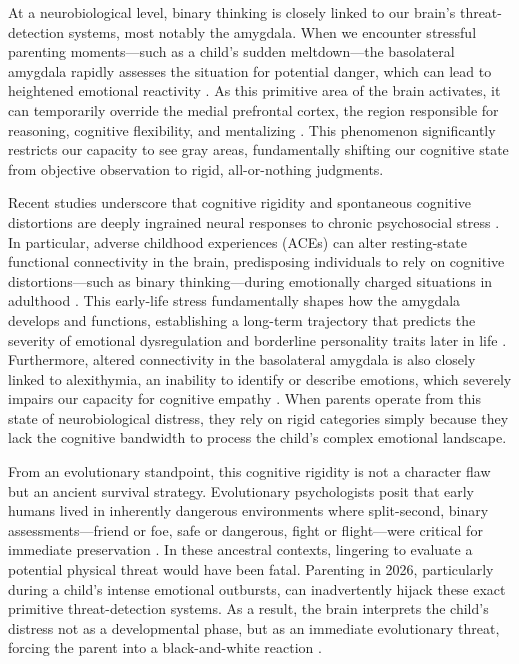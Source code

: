 At a neurobiological level, binary thinking is closely linked to our brain's threat-detection systems, most notably the amygdala.
When we encounter stressful parenting moments---such as a child's sudden meltdown---the basolateral amygdala rapidly assesses the situation for potential danger, which can lead to heightened emotional reactivity \citep{iidaka2024}.
As this primitive area of the brain activates, it can temporarily override the medial prefrontal cortex, the region responsible for reasoning, cognitive flexibility, and mentalizing \citep{he2025, mavrych2025}.
This phenomenon significantly restricts our capacity to see gray areas, fundamentally shifting our cognitive state from objective observation to rigid, all-or-nothing judgments.

Recent studies underscore that cognitive rigidity and spontaneous cognitive distortions are deeply ingrained neural responses to chronic psychosocial stress \citep{pan2025, rajput2025}.
In particular, adverse childhood experiences (ACEs) can alter resting-state functional connectivity in the brain, predisposing individuals to rely on cognitive distortions---such as binary thinking---during emotionally charged situations in adulthood \citep{cazzella2024}.
This early-life stress fundamentally shapes how the amygdala develops and functions, establishing a long-term trajectory that predicts the severity of emotional dysregulation and borderline personality traits later in life \citep{constantino2026}.
Furthermore, altered connectivity in the basolateral amygdala is also closely linked to alexithymia, an inability to identify or describe emotions, which severely impairs our capacity for cognitive empathy \citep{li2024}.
When parents operate from this state of neurobiological distress, they rely on rigid categories simply because they lack the cognitive bandwidth to process the child's complex emotional landscape.

From an evolutionary standpoint, this cognitive rigidity is not a character flaw but an ancient survival strategy.
Evolutionary psychologists posit that early humans lived in inherently dangerous environments where split-second, binary assessments---friend or foe, safe or dangerous, fight or flight---were critical for immediate preservation \citep{saunders2025}.
In these ancestral contexts, lingering to evaluate a potential physical threat would have been fatal.
Parenting in 2026, particularly during a child's intense emotional outbursts, can inadvertently hijack these exact primitive threat-detection systems.
As a result, the brain interprets the child's distress not as a developmental phase, but as an immediate evolutionary threat, forcing the parent into a black-and-white reaction \citep{thornton2024}.

